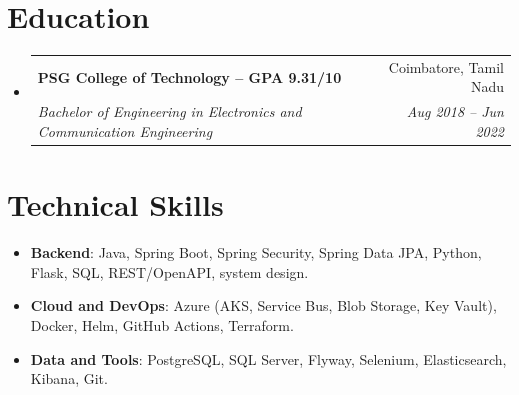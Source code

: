\documentclass[letterpaper,9pt]{article}
\makeatletter
\newcommand{\resumeSubheading}[4]{
    \vspace{-2pt}\item
      \begin{tabular*}{0.97\textwidth}[t]{l@{\extracolsep{\fill}}r}
        \textbf{#1} & #2 \\
        \textit{\large#3} & \textit{\large #4} \\
      \end{tabular*}\vspace{-7pt}
  }
\newcommand{\resumeSubHeadingListStart}{\begin{itemize}[leftmargin=0.15in, label={}]}
\newcommand{\resumeSubHeadingListEnd}{\end{itemize}}
\makeatother
\begin{document}
  \vspace{-10pt}




  \section{Education}
    \resumeSubHeadingListStart
      \resumeSubheading
        {PSG College of Technology \textmd{-- GPA \textbf{9.31/10}}}{ Coimbatore, Tamil Nadu}
        {Bachelor of Engineering in Electronics and Communication Engineering}{Aug 2018 -- Jun 2022}
    \resumeSubHeadingListEnd






  \section{Technical Skills}
    \begin{itemize}[leftmargin=0.15in, label={}]
      \item \large{
          \textbf{Backend}: Java, Spring Boot, Spring Security, Spring Data JPA, Python, Flask, SQL, REST/OpenAPI, system design.
      }
      \item \large{
          \textbf{Cloud and DevOps}: Azure (AKS, Service Bus, Blob Storage, Key Vault), Docker, Helm, GitHub Actions, Terraform.
      }
      \item \large{
          \textbf{Data and Tools}: PostgreSQL, SQL Server, Flyway, Selenium, Elasticsearch, Kibana, Git.
      }
    \end{itemize}



  
\end{document}
